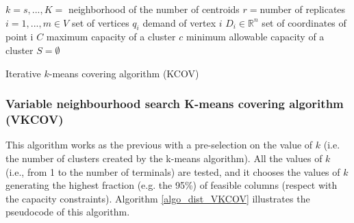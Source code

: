 \begin{algorithm}[H]
\DontPrintSemicolon
\SetAlgoLined
$k=s,...,K =$ neighborhood of the number of centroids \;
$r=$number of replicates\;
$i=1,...,m \in V$ set of vertices \;
$q_i$ demand of vertex $i$ \;
$D_i \in \mathbb{R}^n $ set of coordinates of point i \;
$C$ maximum capacity of a cluster \;
$c$ minimum allowable capacity of a cluster \;
$S= \emptyset $ \;

    
\caption{Iterative $k$-means covering algorithm (KCOV)}
\label{algo_dist_KCOV}    
\end{algorithm}

\subsubsection{Variable neighbourhood search K-means covering algorithm (VKCOV)}

This algorithm works as the previous with a pre-selection on the value of $k$ (i.e. the number of clusters created by the k-means algorithm). All the values of $k$ (i.e., from 1 to the number of terminals) are tested, and it chooses the values of $k$ generating the highest fraction (e.g. the 95\%) of feasible columns (respect with the capacity constraints). Algorithm \ref{algo_dist_VKCOV} illustrates the pseudocode of this algorithm.

